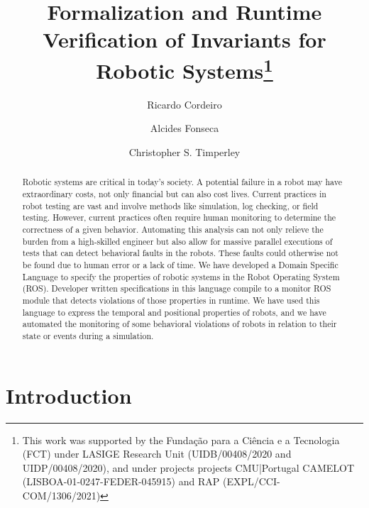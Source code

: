 \documentclass[runningheads]{llncs}
\begin{document}
\title{Formalization and Runtime Verification of Invariants for
Robotic Systems\thanks{This work was supported by the Fundação para a Ciência e a Tecnologia (FCT) under LASIGE Research Unit (UIDB/00408/2020 and UIDP/00408/2020), and under projects projects CMU|Portugal CAMELOT (LISBOA-01-0247-FEDER-045915) and RAP (EXPL/CCI-COM/1306/2021)}}

\author{Ricardo Cordeiro \and
Alcides Fonseca \and
Christopher S. Timperley}



\maketitle

\begin{abstract}
    Robotic systems are critical in today's society. A potential failure in a robot may have extraordinary costs, not only financial but can also cost lives.
    Current practices in robot testing are vast and involve methods like simulation, log checking, or field testing. However, current practices often require human monitoring to determine the correctness of a given behavior. Automating this analysis can not only relieve the burden from a high-skilled engineer but also allow for massive parallel executions of tests that can detect behavioral faults in the robots. These faults could otherwise not be found due to human error or a lack of time.
    We have developed a Domain Specific Language to specify the properties of robotic systems in the Robot Operating System (ROS). Developer written specifications in this language compile to a monitor ROS module that detects violations of those properties in runtime. We have used this language to express the temporal and positional properties of robots, and we have automated the monitoring of some behavioral violations of robots in relation to their state or events during a simulation.

\end{abstract}


\section{Introduction}
\end{document}
